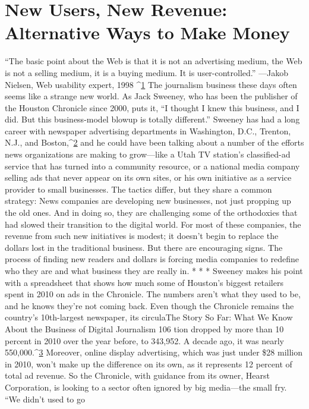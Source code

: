 \chapter{New Users, New Revenue: Alternative Ways to Make Money}
``The basic point about the Web is that it is not an advertising medium, the
Web is not a selling medium, it is a buying medium. It is user-controlled.''
—Jakob Nielsen, Web usability expert, 1998 ^{\href{#endnotes-ch8}{1}}
The journalism business these days often seems like a strange new world.
As Jack Sweeney, who has been the publisher of the Houston Chronicle since
2000, puts it, ``I thought I knew this business, and I did. But this business-model
blowup is totally different.'' Sweeney has had a long career with newspaper advertising
departments in Washington, D.C., Trenton, N.J., and Boston,^{\href{#endnotes-ch8}{2}} and he
could have been talking about a number of the efforts news organizations are
making to grow—like a Utah TV station’s classified-ad service that has turned
into a community resource, or a national media company selling ads that never
appear on its own sites, or his own initiative as a service provider to small businesses.
The tactics differ, but they share a common strategy: News companies
are developing new businesses, not just propping up the old ones. And in doing
so, they are challenging some of the orthodoxies that had slowed their transition
to the digital world.
For most of these companies, the revenue from such new initiatives is modest;
it doesn’t begin to replace the dollars lost in the traditional business. But there
are encouraging signs. The process of finding new readers and dollars is forcing
media companies to redefine who they are and what business they are really in.
* * *
Sweeney makes his point with a spreadsheet that shows how much some of
Houston’s biggest retailers spent in 2010 on ads in the Chronicle. The numbers
aren’t what they used to be, and he knows they’re not coming back. Even
though the Chronicle remains the country’s 10th-largest newspaper, its circulaThe
Story So Far: What We Know About the Business of Digital Journalism
106
tion dropped by more than 10 percent in 2010 over the year before, to 343,952.
A decade ago, it was nearly 550,000.^{\href{#endnotes-ch8}{3}} Moreover, online display advertising, which
was just under \$28 million in 2010, won’t make up the difference on its own, as
it represents 12 percent of total ad revenue.
So the Chronicle, with guidance from its owner, Hearst Corporation, is looking
to a sector often ignored by big media—the small fry. ``We didn’t used to go
